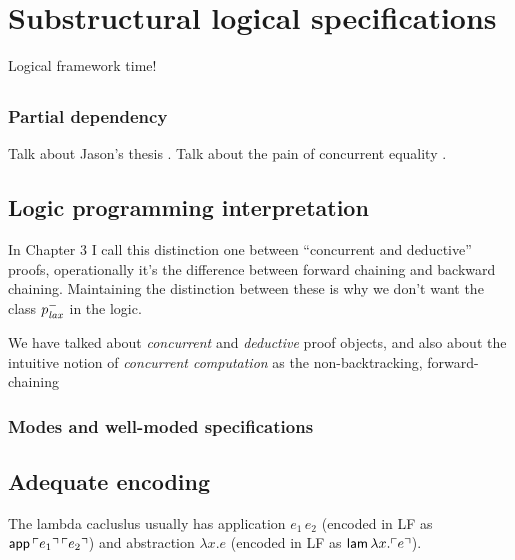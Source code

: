 \chapter{Substructural logical specifications}

Logical framework time!

\section{}

\subsection{Partial dependency}
\label{sec:why-not-fully-dependent}

Talk about Jason's thesis \cite{}. Talk about the pain of concurrent 
equality \cite{}.

\section{Logic programming interpretation}
\label{sec:framework-logicprog}

In Chapter 3 I call this distinction one between ``concurrent and deductive''
proofs, operationally it's the difference between forward chaining 
and backward chaining. Maintaining the distinction between these is why
we don't want the class $p^-_{\it lax}$ in the logic.

We have talked about {\it concurrent} and {\it deductive} proof
objects, and also about the intuitive notion of {\it concurrent
  computation} as the non-backtracking, forward-chaining 

\subsection{Modes and well-moded specifications}
\label{sec:framework-modes}

\section{Adequate encoding}

The lambda
cacluslus usually has application $e_1\,e_2$ (encoded in LF as ${\sf
  app}\,{\ulcorner{e_1}\urcorner}\,{\ulcorner{e_2}\urcorner}$) and abstraction $\lambda x.e$
(encoded in LF as ${\sf lam}\,\lambda x. {\ulcorner{e}\urcorner}$). 



